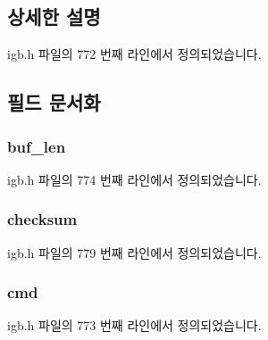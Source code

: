 \subsection{상세한 설명}


igb.\+h 파일의 772 번째 라인에서 정의되었습니다.



\subsection{필드 문서화}
\subsubsection[{\texorpdfstring{buf\+\_\+len}{buf_len}}]{ buf\+\_\+len}\hypertarget{structe1000__fw__hdr_aa84cf7e5aebcb9675115b32997eb356d}{}\label{structe1000__fw__hdr_aa84cf7e5aebcb9675115b32997eb356d}


igb.\+h 파일의 774 번째 라인에서 정의되었습니다.

\subsubsection[{\texorpdfstring{checksum}{checksum}}]{ checksum}\hypertarget{structe1000__fw__hdr_afd93107fee98407f162be1294fb053fd}{}\label{structe1000__fw__hdr_afd93107fee98407f162be1294fb053fd}


igb.\+h 파일의 779 번째 라인에서 정의되었습니다.

\subsubsection[{\texorpdfstring{cmd}{cmd}}]{ cmd}\hypertarget{structe1000__fw__hdr_a0c40b83f263927828422c91c3e9828be}{}\label{structe1000__fw__hdr_a0c40b83f263927828422c91c3e9828be}


igb.\+h 파일의 773 번째 라인에서 정의되었습니다.

